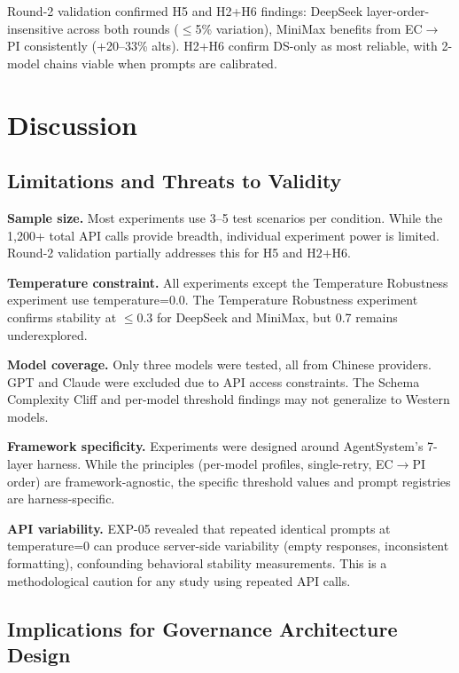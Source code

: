 \documentclass[11pt,a4paper]{article}
\begin{document}
Round-2 validation confirmed H5 and H2+H6 findings: DeepSeek layer-order-insensitive across both rounds ($\leq$5\% variation), MiniMax benefits from EC$\rightarrow$PI consistently (+20--33\% alts). H2+H6 confirm DS-only as most reliable, with 2-model chains viable when prompts are calibrated.

\FloatBarrier
\section{Discussion}

\subsection{Limitations and Threats to Validity}

\textbf{Sample size.} Most experiments use 3--5 test scenarios per condition. While the 1,200+ total API calls provide breadth, individual experiment power is limited. Round-2 validation partially addresses this for H5 and H2+H6.

\textbf{Temperature constraint.} All experiments except the Temperature Robustness experiment use temperature=0.0. The Temperature Robustness experiment confirms stability at $\leq$0.3 for DeepSeek and MiniMax, but 0.7 remains underexplored.

\textbf{Model coverage.} Only three models were tested, all from Chinese providers. GPT and Claude were excluded due to API access constraints. The Schema Complexity Cliff and per-model threshold findings may not generalize to Western models.

\textbf{Framework specificity.} Experiments were designed around AgentSystem's 7-layer harness. While the principles (per-model profiles, single-retry, EC$\rightarrow$PI order) are framework-agnostic, the specific threshold values and prompt registries are harness-specific.

\textbf{API variability.} EXP-05 revealed that repeated identical prompts at temperature=0 can produce server-side variability (empty responses, inconsistent formatting), confounding behavioral stability measurements. This is a methodological caution for any study using repeated API calls.

\subsection{Implications for Governance Architecture Design}
\end{document}
